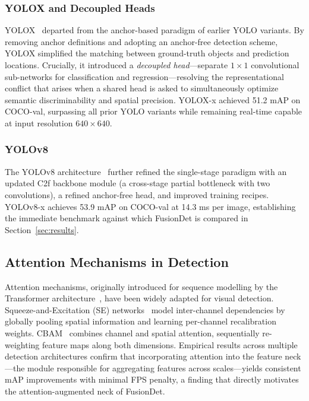 \subsubsection{YOLOX and Decoupled Heads}

YOLOX~\cite{ge2021yolox} departed from the anchor-based
paradigm of earlier YOLO variants.  By removing anchor
definitions and adopting an anchor-free detection scheme,
YOLOX simplified the matching between ground-truth objects and
prediction locations.  Crucially, it introduced a
\textit{decoupled head}---separate $1\times1$ convolutional
sub-networks for classification and regression---resolving the
representational conflict that arises when a shared head is
asked to simultaneously optimize semantic discriminability and
spatial precision.  YOLOX-x achieved 51.2 mAP on COCO-val,
surpassing all prior YOLO variants while remaining real-time
capable at input resolution $640 \times 640$.

\subsubsection{YOLOv8}

The YOLOv8 architecture~\cite{wang2023yolov8} further refined
the single-stage paradigm with an updated C2f backbone module
(a cross-stage partial bottleneck with two convolutions),
a refined anchor-free head, and improved training recipes.
YOLOv8-x achieves 53.9 mAP on COCO-val at 14.3 ms per image,
establishing the immediate benchmark against which FusionDet
is compared in Section~\ref{sec:results}.

\subsection{Attention Mechanisms in Detection}

Attention mechanisms, originally introduced for sequence
modelling by the Transformer architecture~\cite{vaswani2017attention},
have been widely adapted for visual detection.  Squeeze-and-Excitation
(SE) networks~\cite{hu2018squeeze} model inter-channel
dependencies by globally pooling spatial information and
learning per-channel recalibration weights.  CBAM~\cite{woo2018cbam}
combines channel and spatial attention, sequentially
re-weighting feature maps along both dimensions.  Empirical
results across multiple detection architectures confirm that
incorporating attention into the feature neck---the module
responsible for aggregating features across scales---yields
consistent mAP improvements with minimal FPS penalty, a finding
that directly motivates the attention-augmented neck of
FusionDet.

